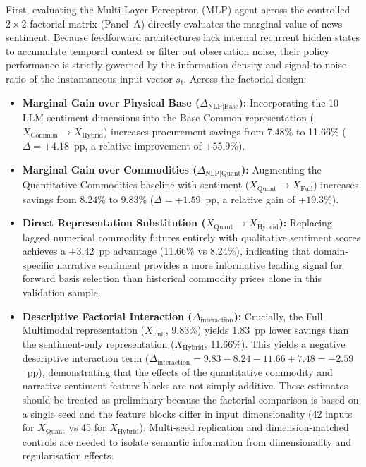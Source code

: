 First, evaluating the Multi-Layer Perceptron (MLP) agent across the controlled $2 \times 2$ factorial matrix (Panel~A) directly evaluates the marginal value of news sentiment. Because feedforward architectures lack internal recurrent hidden states to accumulate temporal context or filter out observation noise, their policy performance is strictly governed by the information density and signal-to-noise ratio of the instantaneous input vector $s_t$. Across the factorial design:
\begin{itemize}
    \item \textbf{Marginal Gain over Physical Base ($\Delta_{\text{NLP|Base}}$):} Incorporating the 10 LLM sentiment dimensions into the Base Common representation ($X_{\text{Common}} \to X_{\text{Hybrid}}$) increases procurement savings from 7.48\% to 11.66\% ($\Delta = +4.18$~pp, a relative improvement of $+55.9\%$).
    \item \textbf{Marginal Gain over Commodities ($\Delta_{\text{NLP|Quant}}$):} Augmenting the Quantitative Commodities baseline with sentiment ($X_{\text{Quant}} \to X_{\text{Full}}$) increases savings from 8.24\% to 9.83\% ($\Delta = +1.59$~pp, a relative gain of $+19.3\%$).
    \item \textbf{Direct Representation Substitution ($X_{\text{Quant}} \to X_{\text{Hybrid}}$):} Replacing lagged numerical commodity futures entirely with qualitative sentiment scores achieves a $+3.42$~pp advantage (11.66\% vs 8.24\%), indicating that domain-specific narrative sentiment provides a more informative leading signal for forward basis selection than historical commodity prices alone in this validation sample.
    \item \textbf{Descriptive Factorial Interaction ($\Delta_{\text{interaction}}$):} Crucially, the Full Multimodal representation ($X_{\text{Full}}$, 9.83\%) yields 1.83~pp lower savings than the sentiment-only representation ($X_{\text{Hybrid}}$, 11.66\%). This yields a negative descriptive interaction term ($\Delta_{\text{interaction}} = 9.83 - 8.24 - 11.66 + 7.48 = -2.59$~pp), demonstrating that the effects of the quantitative commodity and narrative sentiment feature blocks are not simply additive. These estimates should be treated as preliminary because the factorial comparison is based on a single seed and the feature blocks differ in input dimensionality (42 inputs for $X_{\text{Quant}}$ vs 45 for $X_{\text{Hybrid}}$). Multi-seed replication and dimension-matched controls are needed to isolate semantic information from dimensionality and regularisation effects.
\end{itemize}

